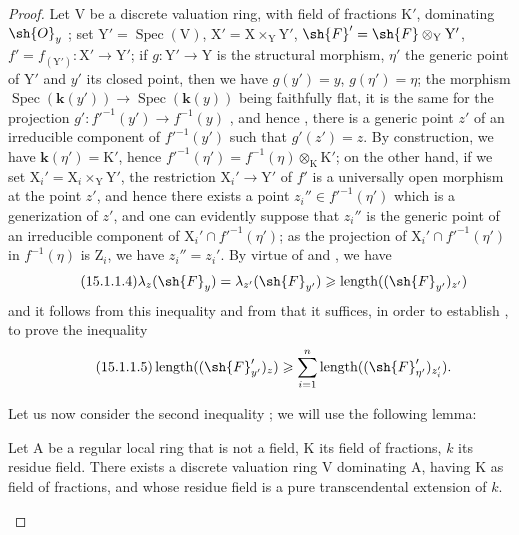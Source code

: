 \begin{proof}
Let $\mathrm{V}$ be a discrete valuation ring, with field of fractions $\mathrm{K}'$, dominating $\sh{O}_y$ ; set $\mathrm{Y}'=\operatorname{Spec}(\mathrm{V})$, $\mathrm{X}'=\mathrm{X}\times_\mathrm{Y}\mathrm{Y}'$, $\sh{F}'=\sh{F}\otimes_\mathrm{Y}\mathrm{Y}'$, $f'=f_{(\mathrm{Y}')}:\mathrm{X}'\to\mathrm{Y}'$; if $g:\mathrm{Y}'\to\mathrm{Y}$ is the structural morphism, $\eta'$ the generic point of $\mathrm{Y}'$ and $y'$ its closed point, then we have $g(y')=y$, $g(\eta')=\eta$; the morphism $\operatorname{Spec}(\mathbf{k}(y'))\to\operatorname{Spec}(\mathbf{k}(y))$ being faithfully flat, it is the same for the projection $g':f'^{-1}(y')\to f^{-1}(y)$ , and hence , there is a generic point $z'$ of an irreducible component of $f'^{-1}(y')$ such that $g'(z')=z$.
By construction, we have $\mathbf{k}(\eta')=\mathrm{K}'$, hence $f'^{-1}(\eta')=f^{-1}(\eta)\otimes_\mathrm{K}\mathrm{K}'$; on the other hand, if we set $\mathrm{X}_i'=\mathrm{X}_i\times_\mathrm{Y}\mathrm{Y}'$, the restriction $\mathrm{X}_i'\to\mathrm{Y}'$ of $f'$ is a universally open morphism at the point $z'$, and hence  there exists a point $z_i''\in f'^{-1}(\eta')$ which is a generization of $z'$, and one can evidently suppose that $z_i''$ is the generic point of an irreducible component of $\mathrm{X}_i'\cap f'^{-1}(\eta')$; as the projection of $\mathrm{X}_i'\cap f'^{-1}(\eta')$ in $f^{-1}(\eta)$ is $\mathrm{Z}_i$, we have $z_i''=z_i'$.
By virtue of  and , we have
\[
\tag{15.1.1.4}
\label{IV.15.1.1.4}
  \lambda_z(\sh{F}_y)=\lambda_{z'}(\sh{F}_{y'})\geqslant\operatorname{length}((\sh{F}_{y'})_{z'})
\]
and it follows from this inequality and from  that it suffices, in order to establish , to prove the inequality
\[
\tag{15.1.1.5}
\label{IV.15.1.1.5}
  \operatorname{length}((\sh{F}_{y'}')_z)\geqslant\sum_{i=1}^{n}\operatorname{length}((\sh{F}_{\eta'}')_{z_i'}).
\]

Let us now consider the second inequality ; we will use the following lemma:

\begin{lemma}[15.1.1.6]
\label{IV.15.1.1.6}
Let $\mathrm{A}$ be a regular local ring that is not a field, $\mathrm{K}$ its field of fractions, $k$ its residue field.
There exists a discrete valuation ring $\mathrm{V}$ dominating $\mathrm{A}$, having $\mathrm{K}$ as field of fractions, and whose residue field is a pure transcendental extension of $k$.
\end{lemma}


\end{proof}
